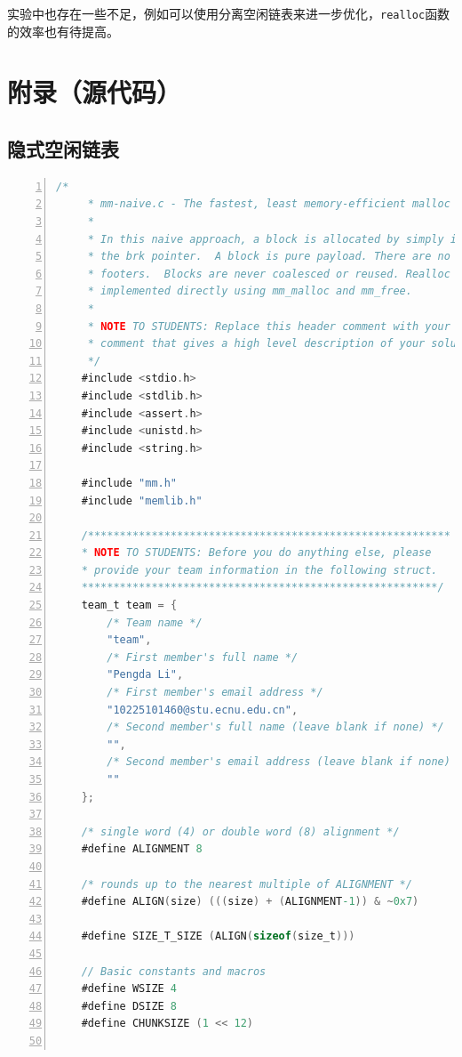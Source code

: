 \documentclass{article}
\begin{document}
实验中也存在一些不足，例如可以使用分离空闲链表来进一步优化，\texttt{realloc}函数的效率也有待提高。

\normalsize

\section{附录（源代码）}

\subsection{隐式空闲链表}
\begin{lstlisting}[xleftmargin = 4em,xrightmargin = 3em, aboveskip = 1em, numbers = left, language = C]
    /*
     * mm-naive.c - The fastest, least memory-efficient malloc package.
     * 
     * In this naive approach, a block is allocated by simply incrementing
     * the brk pointer.  A block is pure payload. There are no headers or
     * footers.  Blocks are never coalesced or reused. Realloc is
     * implemented directly using mm_malloc and mm_free.
     *
     * NOTE TO STUDENTS: Replace this header comment with your own header
     * comment that gives a high level description of your solution.
     */
    #include <stdio.h>
    #include <stdlib.h>
    #include <assert.h>
    #include <unistd.h>
    #include <string.h>

    #include "mm.h"
    #include "memlib.h"

    /*********************************************************
    * NOTE TO STUDENTS: Before you do anything else, please
    * provide your team information in the following struct.
    ********************************************************/
    team_t team = {
        /* Team name */
        "team",
        /* First member's full name */
        "Pengda Li",
        /* First member's email address */
        "10225101460@stu.ecnu.edu.cn",
        /* Second member's full name (leave blank if none) */
        "",
        /* Second member's email address (leave blank if none) */
        ""
    };

    /* single word (4) or double word (8) alignment */
    #define ALIGNMENT 8

    /* rounds up to the nearest multiple of ALIGNMENT */
    #define ALIGN(size) (((size) + (ALIGNMENT-1)) & ~0x7)

    #define SIZE_T_SIZE (ALIGN(sizeof(size_t)))

    // Basic constants and macros
    #define WSIZE 4
    #define DSIZE 8
    #define CHUNKSIZE (1 << 12)


\end{lstlisting}
\end{document}
